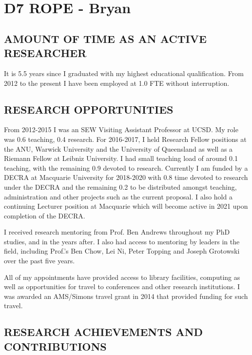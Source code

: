 \documentclass[12pt]{article}
\author{Paul Bryan}
\date{}
\title{}
\begin{document}
\section*{D7 ROPE - Bryan}
\label{sec:org0fa3db3}

\subsection*{AMOUNT OF TIME AS AN ACTIVE RESEARCHER}
\label{sec:orga9a1f91}

It is 5.5 years since I graduated with my highest educational qualification. From 2012 to the present I have been employed at 1.0 FTE without interruption. 

\subsection*{RESEARCH OPPORTUNITIES}
\label{sec:org5c519eb}

From 2012-2015 I was an SEW Visiting Assistant Professor at UCSD. My role was 0.6 teaching, 0.4 research. For 2016-2017, I held Research Fellow positions at the ANU, Warwick University and the University of Queensland as well as a Riemann Fellow at Leibniz University. I had small teaching load of around 0.1 teaching, with the remaining 0.9 devoted to research. Currently I am funded by a DECRA at Macquarie University for 2018-2020 with 0.8 time devoted to research under the DECRA and the remaining 0.2 to be distributed amongst teaching, administration and other projects such as the current proposal. I also hold a continuing Lecturer position at Macquarie which will become active in 2021 upon completion of the DECRA.

I received research mentoring from Prof. Ben Andrews throughout my PhD studies, and in the years after. I also had access to mentoring by leaders in the field, including Prof.'s Ben Chow, Lei Ni, Peter Topping and Joseph Grotowski over the past five years.

All of my appointments have provided access to library facilities, computing as well as opportunities for travel to conferences and other research institutions. I was awarded an AMS/Simons travel grant in 2014 that provided funding for such travel.

\subsection*{RESEARCH ACHIEVEMENTS AND CONTRIBUTIONS}
\label{sec:orgdfafa48}
\end{document}
